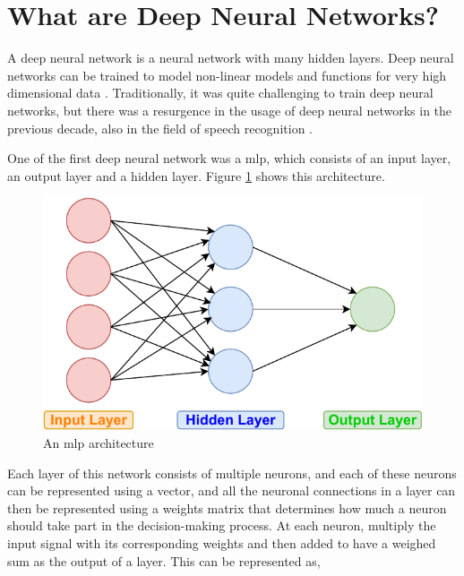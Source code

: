 \section{What are Deep Neural Networks?}
A deep neural network is a neural network with many hidden layers. Deep neural networks can be trained to model non-linear models and functions for very high dimensional data \cite{Hammer2003AMachines}. Traditionally, it was quite challenging to train deep neural networks, but there was a resurgence in the usage of deep neural networks in the previous decade, also in the field of speech recognition \cite{Dahl2012Context-DependentRecognition, Morgan2012DeepRecognition, Deng2013RECENTMICROSOFT, Hannun2014DeepRecognition}. 

One of the first deep neural network was a \acrfull{mlp}, which consists of an input layer, an output layer and a hidden layer. Figure \ref{fig:mlp} shows this architecture. 

\begin{figure}[ht]
  \begin{center}
    \includegraphics[width=\textwidth]{images/MLP.pdf} 
    \caption{An \acrshort{mlp} architecture}
    \label{fig:mlp}
  \end{center}
\end{figure}

Each layer of this network consists of multiple neurons, and each of these neurons can be represented using a vector, and all the neuronal connections in a layer can then be represented using a weights matrix that determines how much a neuron should take part in the decision-making process. At each neuron, multiply the input signal with its corresponding weights and then added to have a weighed sum as the output of a layer. This can be represented as,

